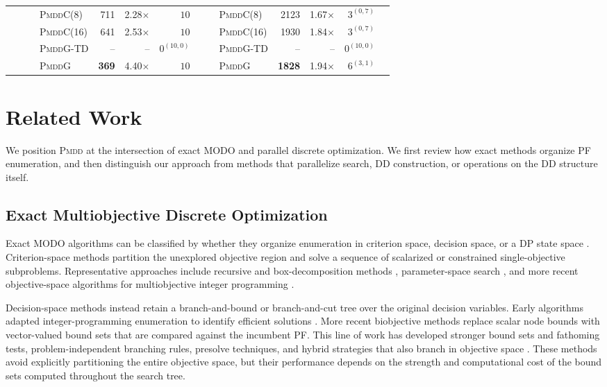 \documentclass[letterpaper]{article}
\begin{document}
\begin{table}[htbp!]
{\begin{tabular}{lrrlrrrrrlrrrr}
 &  &  & \textsc{PmddC}(8) & 711 & 2.28$\times$ & $10$ &  &  & \textsc{PmddC}(8) & 2123 & 1.67$\times$ & $3^{(0, 7)}$ \\
 &  &  & \textsc{PmddC}(16) & 641 & 2.53$\times$ & $10$ &  &  & \textsc{PmddC}(16) & 1930 & 1.84$\times$ & $3^{(0, 7)}$ \\
 &  &  & \textsc{PmddG-TD} & -- & -- & $0^{(10, 0)}$ &  &  & \textsc{PmddG-TD} & -- & -- & $0^{(10, 0)}$ \\
 &  &  & \textsc{PmddG} & \textbf{369} & 4.40$\times$ & $10$ &  &  & \textsc{PmddG} & \textbf{1828} & 1.94$\times$ & $6^{(3, 1)}$ \\
\bottomrule
\end{tabular}
}
\label{tab:combined_result_short}
\end{table}


\section{Related Work}
\label{sec:related}
We position \textsc{Pmdd} at the intersection of exact MODO and parallel discrete optimization. We first review how exact methods organize PF enumeration, and then distinguish our approach from methods that parallelize search, DD construction, or operations on the DD structure itself.

\subsection{Exact Multiobjective Discrete Optimization}
\label{sec:related_exact}
Exact MODO algorithms can be classified by whether they organize enumeration in criterion space, decision space, or a DP state space \citep{ehrgott2016exact,halffmann2022exact}. Criterion-space methods partition the unexplored objective region and solve a sequence of scalarized or constrained single-objective subproblems. Representative approaches include recursive and box-decomposition methods \citep{ozlen2009multi,ozlen2014multi,boland2015criterion}, parameter-space search \citep{kirlik2014new}, and more recent objective-space algorithms for multiobjective integer programming \citep{tamby2021enumeration,dachert2024simple}.

Decision-space methods instead retain a branch-and-bound or branch-and-cut tree over the original decision variables. Early algorithms adapted integer-programming enumeration to identify efficient solutions \citep{klein1982algorithm,kiziltan1983algorithm}. More recent biobjective methods replace scalar node bounds with vector-valued bound sets that are compared against the incumbent PF. This line of work has developed stronger bound sets and fathoming tests, problem-independent branching rules, presolve techniques, and hybrid strategies that also branch in objective space \citep{stidsen2014branch,parragh2019branch,adelgren2022branch}. These methods avoid explicitly partitioning the entire objective space, but their performance depends on the strength and computational cost of the bound sets computed throughout the search tree.
\end{document}
